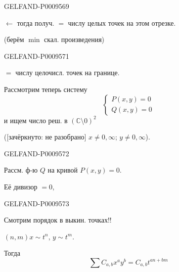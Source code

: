 \begin{GelfandAdjacentEvidence}{GELFAND-P000956}{9}

$\leftarrow$ тогда получ. $=$ числу целых точек на этом отрезке.
\end{GelfandAdjacentEvidence}


(берём $\min$ скал. произведения)

\begin{GelfandAdjacentEvidence}{GELFAND-P000957}{1}

 $=$ числу целочисл. точек на границе.

Рассмотрим теперь систему
\begin{equation*}
 \begin{cases}
 P(x,y)=0\\
 Q(x,y)=0
 \end{cases}
 \tag{10}
\end{equation*}
и ищем число реш. в $(\mathbb C\setminus0)^2$

([зачёркнуто: не разобрано] $x\ne0,\infty$; $y\ne0,\infty$).
\end{GelfandAdjacentEvidence}
\begin{GelfandAdjacentEvidence}{GELFAND-P000957}{2}


Рассм. ф-ю $Q$ на кривой $P(x,y)=0$.

Её дивизор $=0$,
\end{GelfandAdjacentEvidence}
\begin{GelfandAdjacentEvidence}{GELFAND-P000957}{3}

Смотрим порядок в выкин. точках!!

$(n,m)$\qquad $x\sim t^n$, $y\sim t^m$.

Тогда
\begin{equation*}
 \sum C_{a,b}x^a y^b=C_{a,b}t^{an+bm}
 \tag{11}
\end{equation*}
\end{GelfandAdjacentEvidence}
